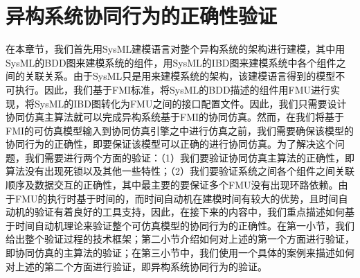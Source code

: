 \chapter{异构系统协同行为的正确性验证}
\label{ch3}
在本章节，我们首先用SysML建模语言对整个异构系统的架构进行建模，其中用SysML的BDD图来建模系统的组件，用SysML的IBD图来建模系统中各个组件之间的关联关系。由于SysML只是用来建模系统的架构，该建模语言得到的模型不可执行。因此，我们基于FMI标准，将SysML的BDD描述的组件用FMU进行实现，将SysML的IBD图转化为FMU之间的接口配置文件。因此，我们只需要设计协同仿真主算法就可以完成异构系统基于FMI的协同仿真。然而，在我们将基于FMI的可仿真模型输入到协同仿真引擎之中进行仿真之前，我们需要确保该模型的协同行为的正确性，即要保证该模型可以正确的进行协同仿真。为了解决这个问题，我们需要进行两个方面的验证：（1）我们要验证协同仿真主算法的正确性，即算法没有出现死锁以及其他一些特性；（2）我们要验证系统之间各个组件之间关联顺序及数据交互的正确性，其中最主要的要保证多个FMU没有出现环路依赖。由于FMU的执行时基于时间的，而时间自动机在建模时间有较大的优势，且时间自动机的验证有着良好的工具支持，因此，在接下来的内容中，我们重点描述如何基于时间自动机理论来验证整个可仿真模型的协同行为的正确性。在第一小节，我们给出整个验证过程的技术框架；第二小节介绍如何对上述的第一个方面进行验证，即协同仿真的主算法的验证；在第三小节中，我们使用一个具体的案例来描述如何对上述的第二个方面进行验证，即异构系统协同行为的验证。
